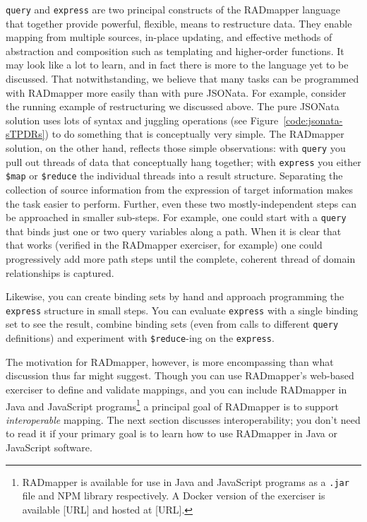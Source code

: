 \documentclass[10pt,letterpaper]{article} %
\newcommand{\stt}[1]{\texttt{#1}} %
\begin{document}
\stt{query} and \stt{express} are two principal constructs of the RADmapper language that together provide powerful, flexible, means to restructure data.
They enable mapping from multiple sources, in-place updating, and effective methods of abstraction and composition such as templating and higher-order functions.
It may look like a lot to learn, and in fact there is more to the language yet to be discussed.
That notwithstanding, we believe that many tasks can be programmed with RADmapper more easily than with pure JSONata.
For example, consider  the running example of restructuring we discussed above.
The pure JSONata solution uses lots of syntax and juggling operations (see Figure~\ref{code:jsonata-sTPDRs}) to do something that is conceptually very simple.
The RADmapper solution, on the other hand, reflects those simple observations: with \stt{query} you pull out threads of data that conceptually hang together;
with \stt{express} you either \stt{\$map} or \stt{\$reduce} the individual threads into a result structure.
Separating the collection of source information from the expression of target information makes the task easier to perform.
Further, even these two mostly-independent steps can be approached in smaller sub-steps.
For example, one could start with a \stt{query} that binds just one or two query variables along a path.
When it is clear that that works (verified in the RADmapper exerciser, for example) one could progressively add more path steps until the complete, coherent thread of domain relationships is captured.

Likewise, you can create binding sets by hand and approach programming the \stt{express} structure in small steps.
You can evaluate \stt{express} with a single binding set to see the result, combine binding sets (even from calls to different \stt{query} definitions) and experiment with \stt{\$reduce}-ing on the \stt{express}.

The motivation for RADmapper, however, is more encompassing than what discussion thus far might suggest.
Though you can use RADmapper's web-based exerciser to define and validate mappings,
and you can include RADmapper in Java and JavaScript programs\footnote{RADmapper is available for use in Java and JavaScript programs as a \stt{.jar} file and NPM library respectively. A Docker version of the exerciser is available [URL] and hosted at [URL].} a principal goal of RADmapper is to support \textit{interoperable} mapping. The next section discusses interoperability; you don't need to read it if your primary goal is to learn how to use RADmapper in Java or JavaScript software.
\end{document}
